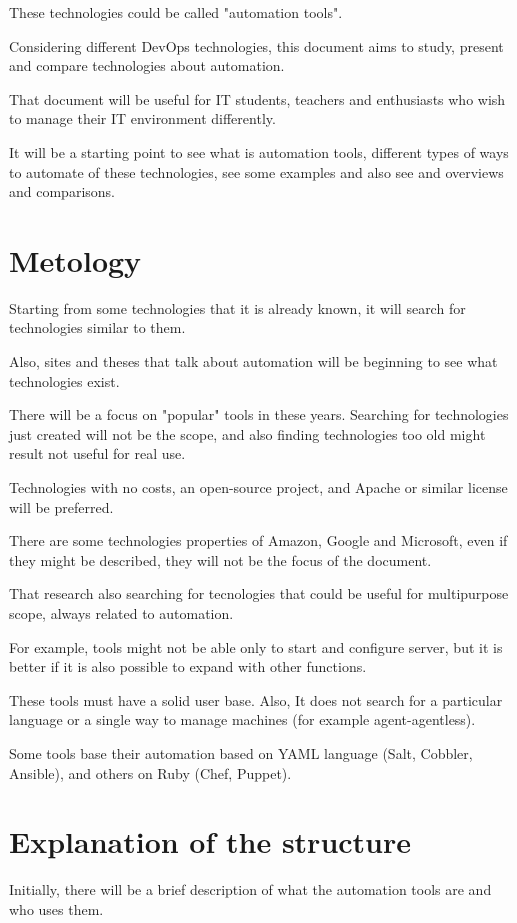 \documentclass[12pt,a4paper,openright,twoside]{book}
\begin{document}
These technologies could be called "automation tools".

Considering different DevOps technologies, this document aims to study, present and compare technologies about automation.

That document will be useful for IT students, teachers and enthusiasts who wish to manage their IT environment differently.


It will be a starting point to see what is automation tools, different types of ways to automate of these technologies, see some examples and also see and overviews and comparisons.

\section{Metology}
Starting from some technologies that it is already known, it will search for technologies similar to them.


Also, sites and theses that talk about automation will be beginning to see what technologies exist.


There will be a focus on "popular" tools in these years. Searching for technologies just created will not be the scope, and also finding technologies too old might result not useful for real use.


Technologies with no costs, an open-source project, and Apache or similar license will be preferred.


There are some technologies properties of Amazon, Google and Microsoft, even if they might be described, they will not be the focus of the document.


That research also searching for tecnologies that could be useful for multipurpose scope, always related to automation.


For example, tools might not be able only to start and configure server, but it is better if it is also possible to expand with other functions.


These tools must have a solid user base. Also, It does not search for a particular language or a single way to manage machines (for example agent-agentless).


Some tools base their automation based on YAML language (Salt, Cobbler, Ansible), and others on Ruby (Chef, Puppet).

\section{Explanation of the structure}
Initially, there will be a brief description of what the automation tools are and who uses them.
\end{document}
